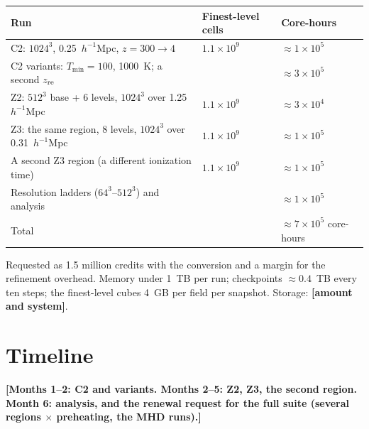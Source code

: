 \documentclass[11pt]{article}
\newcommand{\todo}[1]{\textbf{[#1]}}
\begin{document}
\begin{center}\small
\begin{tabular}{lll}
\toprule
Run & Finest-level cells & Core-hours \\
\midrule
C2: $1024^3$, 0.25~$h^{-1}$Mpc, $z = 300 \to 4$ & $1.1\times10^9$ & $\approx 1\times10^5$ \\
C2 variants: $T_{\min} = 100$, 1000~K; a second $z_{\rm re}$ & & $\approx 3\times10^5$ \\
Z2: $512^3$ base + 6 levels, $1024^3$ over 1.25~$h^{-1}$Mpc & $1.1\times10^9$ & $\approx 3\times10^4$ \\
Z3: the same region, 8 levels, $1024^3$ over 0.31~$h^{-1}$Mpc & $1.1\times10^9$ & $\approx 1\times10^5$ \\
A second Z3 region (a different ionization time) & $1.1\times10^9$ & $\approx 1\times10^5$ \\
Resolution ladders ($64^3$--$512^3$) and analysis & & $\approx 1\times10^5$ \\
\midrule
Total & & $\approx 7\times10^5$ core-hours \\
\bottomrule
\end{tabular}
\end{center}
\noindent Requested as 1.5 million credits with the conversion and a margin
for the refinement overhead. Memory under 1~TB per run; checkpoints
$\approx 0.4$~TB every ten steps; the finest-level cubes 4~GB per field per
snapshot. Storage: \todo{amount and system}.

\section{Timeline}

\todo{Months 1--2: C2 and variants. Months 2--5: Z2, Z3, the second region.
Month 6: analysis, and the renewal request for the full suite (several regions
$\times$ preheating, the MHD runs).}
\end{document}
